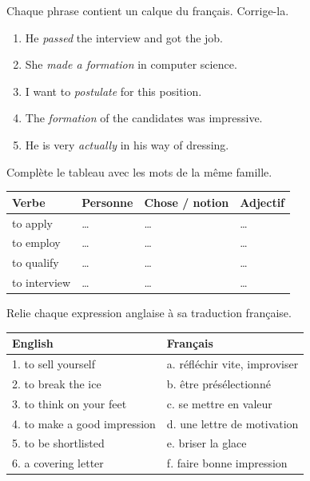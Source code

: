 \documentclass[11pt]{article}
\begin{document}
\begin{exercice}
Chaque phrase contient un calque du français. Corrige-la.
\begin{enumerate}
\item He \emph{passed} the interview and got the job.
\item She \emph{made a formation} in computer science.
\item I want to \emph{postulate} for this position.
\item The \emph{formation} of the candidates was impressive.
\item He is very \emph{actually} in his way of dressing.
\end{enumerate}
\end{exercice}

\begin{exercice}
Complète le tableau avec les mots de la même famille.
\begin{center}
\begin{tabularx}{\linewidth}{|X|X|X|X|}
\hline
\rowcolor{popblueL} Verbe & Personne & Chose / notion & Adjectif \\
\hline
to apply & \dots & \dots & \dots \\
\hline
to employ & \dots & \dots & \dots \\
\hline
to qualify & \dots & \dots & \dots \\
\hline
to interview & \dots & \dots & \dots \\
\hline
\end{tabularx}
\end{center}
\end{exercice}

\begin{exercice}
Relie chaque expression anglaise à sa traduction française.
\begin{center}
\begin{tabularx}{\linewidth}{|X|X|}
\hline
\rowcolor{popblueL} English & Français \\
\hline
1. to sell yourself & a. réfléchir vite, improviser \\
\hline
2. to break the ice & b. être présélectionné \\
\hline
3. to think on your feet & c. se mettre en valeur \\
\hline
4. to make a good impression & d. une lettre de motivation \\
\hline
5. to be shortlisted & e. briser la glace \\
\hline
6. a covering letter & f. faire bonne impression \\
\hline
\end{tabularx}
\end{center}
\end{exercice}
\end{document}
